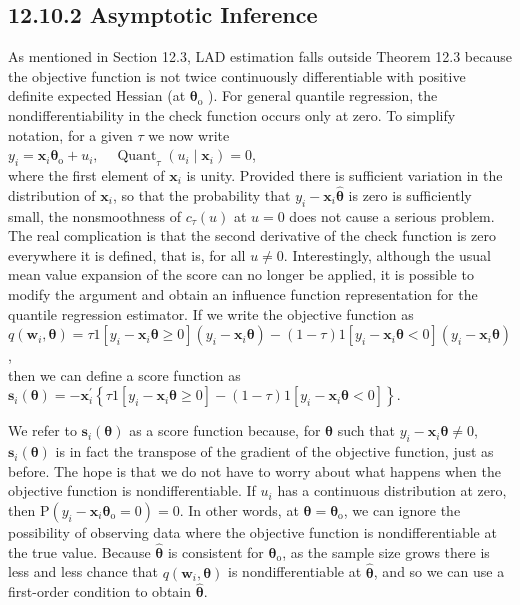 \documentclass[10pt]{article}
\begin{document}
\subsection*{12.10.2 Asymptotic Inference}
As mentioned in Section 12.3, LAD estimation falls outside Theorem 12.3 because the objective function is not twice continuously differentiable with positive definite expected Hessian (at $\boldsymbol{\theta}_{\mathrm{o}}$ ). For general quantile regression, the nondifferentiability in the check function occurs only at zero. To simplify notation, for a given $\tau$ we now write\\
$y_{i}=\mathbf{x}_{i} \boldsymbol{\theta}_{\mathrm{o}}+u_{i}, \quad \operatorname{Quant}_{\tau}\left(u_{i} \mid \mathbf{x}_{i}\right)=0$,\\
where the first element of $\mathbf{x}_{i}$ is unity. Provided there is sufficient variation in the distribution of $\mathbf{x}_{i}$, so that the probability that $y_{i}-\mathbf{x}_{i} \hat{\boldsymbol{\theta}}$ is zero is sufficiently small, the nonsmoothness of $c_{\tau}(u)$ at $u=0$ does not cause a serious problem. The real complication is that the second derivative of the check function is zero everywhere it is defined, that is, for all $u \neq 0$. Interestingly, although the usual mean value expansion of the score can no longer be applied, it is possible to modify the argument and obtain an influence function representation for the quantile regression estimator. If we write the objective function as\\
$q\left(\mathbf{w}_{i}, \boldsymbol{\theta}\right)=\tau 1\left[y_{i}-\mathbf{x}_{i} \boldsymbol{\theta} \geq 0\right]\left(y_{i}-\mathbf{x}_{i} \boldsymbol{\theta}\right)-(1-\tau) 1\left[y_{i}-\mathbf{x}_{i} \boldsymbol{\theta}<0\right]\left(y_{i}-\mathbf{x}_{i} \boldsymbol{\theta}\right)$,\\
then we can define a score function as\\
$\mathbf{s}_{i}(\boldsymbol{\theta})=-\mathbf{x}_{i}^{\prime}\left\{\tau 1\left[y_{i}-\mathbf{x}_{i} \boldsymbol{\theta} \geq 0\right]-(1-\tau) 1\left[y_{i}-\mathbf{x}_{i} \boldsymbol{\theta}<0\right]\right\}$.

We refer to $\mathbf{s}_{i}(\boldsymbol{\theta})$ as a score function because, for $\boldsymbol{\theta}$ such that $y_{i}-\mathbf{x}_{i} \boldsymbol{\theta} \neq 0$, $\mathbf{s}_{i}(\boldsymbol{\theta})$ is in fact the transpose of the gradient of the objective function, just as before. The hope is that we do not have to worry about what happens when the objective function is nondifferentiable. If $u_{i}$ has a continuous distribution at zero, then $\mathrm{P}\left(y_{i}-\mathbf{x}_{i} \boldsymbol{\theta}_{\mathrm{o}}=0\right)=0$. In other words, at $\boldsymbol{\theta}=\boldsymbol{\theta}_{\mathrm{o}}$, we can ignore the possibility of observing data where the objective function is nondifferentiable at the true value. Because $\hat{\boldsymbol{\theta}}$ is consistent for $\boldsymbol{\theta}_{\mathrm{o}}$, as the sample size grows there is less and less chance that $q\left(\mathbf{w}_{i}, \boldsymbol{\theta}\right)$ is nondifferentiable at $\hat{\boldsymbol{\theta}}$, and so we can use a first-order condition to obtain $\hat{\boldsymbol{\theta}}$.
\end{document}
